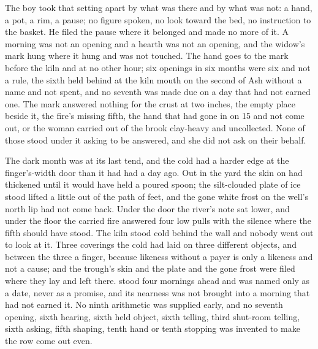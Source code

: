 The boy took that setting apart by what was there and by what was not: a hand, a pot, a rim, a pause; no figure spoken, no look toward the bed, no instruction to the basket. He filed the pause where it belonged and made no more of it. A morning was not an opening and a hearth was not an opening, and the widow's mark hung where it hung and was not touched. The hand goes to the mark before the kiln and at no other hour; six openings in six months were six and not a rule, the sixth held behind at the kiln mouth on the second of Ash without a name and not spent, and no seventh was made due on a day that had not earned one. The mark answered nothing for the crust at two inches, the empty place beside it, the fire's missing fifth, the hand that had gone in on  15 and not come out, or the woman carried out of the brook clay-heavy and uncollected. None of those stood under it asking to be answered, and she did not ask on their behalf.

\scenebreak

The dark month was at its last tend, and the cold had a harder edge at the finger's-width door than it had had a day ago. Out in the yard the skin on  had thickened until it would have held a poured spoon; the silt-clouded plate of ice stood lifted a little out of the path of feet, and the gone white frost on the well's north lip had not come back. Under the door the river's note sat lower, and under the floor the carried fire answered four low pulls with the silence where the fifth should have stood. The kiln stood cold behind the wall and nobody went out to look at it. Three coverings the cold had laid on three different objects, and between the three a finger, because likeness without a payer is only a likeness and not a cause; and the trough's skin and the plate and the gone frost were filed where they lay and left there.  stood four mornings ahead and was named only as a date, never as a promise, and its nearness was not brought into a morning that had not earned it. No ninth arithmetic was supplied early, and no seventh opening, sixth hearing, sixth held object, sixth telling, third shut-room telling, sixth asking, fifth shaping, tenth hand or tenth stopping was invented to make the row come out even.

\scenebreak

